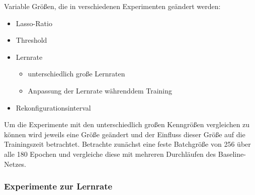Variable Größen, die in verschiedenen Experimenten geändert werden:

\begin{itemize}
 \item Lasso-Ratio
 \item Threshold
 \item Lernrate
 \begin{itemize}
  \item unterschiedlich große Lernraten
  \item Anpassung der Lernrate währenddem Training
 \end{itemize}
 \item Rekonfigurationsinterval
\end{itemize}

Um die Experimente mit den unterschiedlich großen Kenngrößen vergleichen zu können wird jeweils eine Größe geändert und der Einfluss dieser Größe auf die Trainingszeit betrachtet. Betrachte zunächst eine feste Batchgröße von 256 über alle 180 Epochen und vergleiche diese mit mehreren Durchläufen des Baseline-Netzes. 



\subsubsection{Experimente zur Lernrate}

